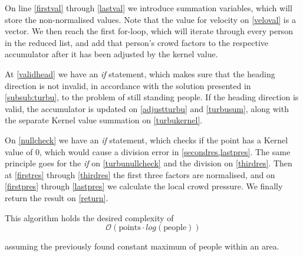 On line \cref{firstval} through \ref{lastval} we introduce summation variables, which will store the non-normalised values. Note that the value for velocity on \cref{veloval} is a vector. We then reach the first for-loop, which will iterate through every person in the reduced list, and add that person's crowd factors to the respective accumulator after it has been adjusted by the kernel value.

At \cref{validhead} we have an \emph{if} statement, which makes sure that the heading direction is not invalid, in accordance with the solution presented in \cref{subsub:turbu}, to the problem of still standing people. If the heading direction is valid, the accumulator is updated on \cref{adjustturbu} and \ref{turbusum}, along with the separate Kernel value summation on \cref{turbukernel}.

On \cref{nullcheck} we have an \emph{if} statement, which checks if the point has a Kernel value of $0$, which would cause a division error in \cref{secondres,lastpres}. The same principle goes for the \emph{if} on \cref{turbunullcheck} and the division on \cref{thirdres}.
Then at \cref{firstres} through \ref{thirdres} the first three factors are normalised, and on \cref{firstpres} through \ref{lastpres} we calculate the local crowd pressure. We finally return the result on \cref{return}.

This algorithm holds the desired complexity of $$\mathcal{O}(\text{points} \cdot log(\text{people}))$$

assuming the previously found constant maximum of people within an area.

